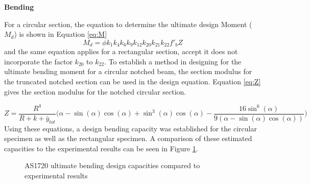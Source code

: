 \documentclass[11pt,a4paper]{article}
\numberwithin{equation}{subsection}
\begin{document}
\vspace*{\baselineskip}
\noindent
\textbf{Bending}\par
\noindent
For a circular section, the equation to determine the ultimate design Moment ($M_{d}$) is shown in Equation \ref{eq:M}
\begin{equation}
M_{d} = \phi k_{1} k_{4} k_{6} k_{9} k_{12} k_{20} k_{21} k_{22} f'_{b} Z
\label{eq:M}
\end{equation}
\noindent
and the same equation applies for a rectangular section, accept it does not incorporate the factor $k_{20}$ to $k_{22}$. To establish a method in designing for the ultimate bending moment for a circular notched beam, the section modulus for the truncated notched section can be used in the design equation. Equation \ref{eq:Z} gives the section modulus for the notched circular section. 

	\begin{equation}
	Z = \frac{R^{4}}{R+k+\bar{y}_{tot}}\bigg(\alpha-\sin(\alpha)\cos(\alpha)+\sin^{3}(\alpha)\cos(\alpha)-\frac{16\sin^{6}(\alpha)}{9(\alpha-\sin(\alpha)\cos(\alpha))}\bigg)
	\label{eq:Z}
	\end{equation}
\noindent
Using these equations, a design bending capacity was established for the circular specimen as well as the rectangular specimen. A comparison of these estimated capacities to the experimental results can be seen in Figure \ref{fig:Bend_Des}.

\vspace*{\baselineskip}

\begin{figure}[h]
	\begin{center}
	\end{center}
	\caption{AS1720 ultimate bending design capacities compared to experimental results}
	\label{fig:Bend_Des}
\end{figure}
\end{document}
